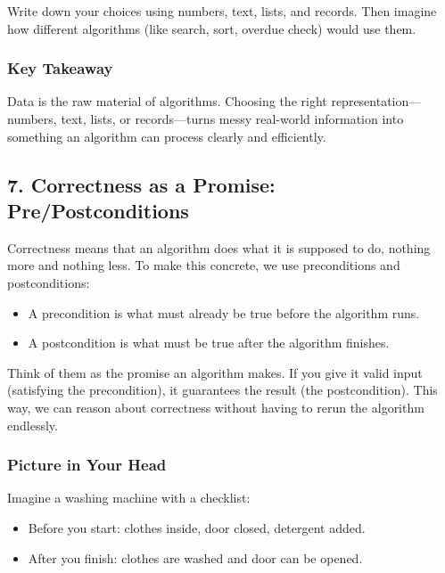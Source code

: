 \documentclass[
  letterpaper,
  DIV=11,
  numbers=noendperiod]{scrreprt}
\providecommand{\tightlist}{%
  \setlength{\itemsep}{0pt}\setlength{\parskip}{0pt}}
\begin{document}
Write down your choices using numbers, text, lists, and records. Then
imagine how different algorithms (like search, sort, overdue check)
would use them.

\subsubsection{Key Takeaway}\label{key-takeaway-4}

Data is the raw material of algorithms. Choosing the right
representation---numbers, text, lists, or records---turns messy
real-world information into something an algorithm can process clearly
and efficiently.

\subsection{7. Correctness as a Promise:
Pre/Postconditions}\label{correctness-as-a-promise-prepostconditions}

Correctness means that an algorithm does what it is supposed to do,
nothing more and nothing less. To make this concrete, we use
preconditions and postconditions:

\begin{itemize}
\tightlist
\item
  A precondition is what must already be true before the algorithm runs.
\item
  A postcondition is what must be true after the algorithm finishes.
\end{itemize}

Think of them as the promise an algorithm makes. If you give it valid
input (satisfying the precondition), it guarantees the result (the
postcondition). This way, we can reason about correctness without having
to rerun the algorithm endlessly.

\subsubsection{Picture in Your Head}\label{picture-in-your-head-6}

Imagine a washing machine with a checklist:

\begin{itemize}
\tightlist
\item
  Before you start: clothes inside, door closed, detergent added.
\item
  After you finish: clothes are washed and door can be opened.
\end{itemize}
\end{document}
